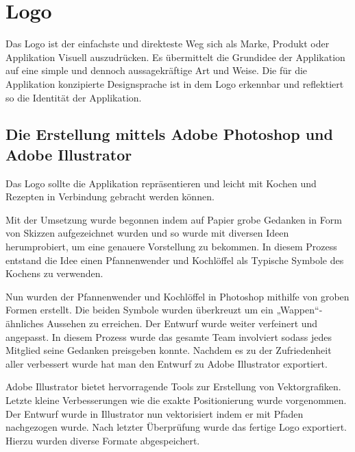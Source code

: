 \section{Logo\cite{Logo}}
Das Logo ist der einfachste und direkteste Weg sich als Marke, Produkt oder Applikation Visuell auszudrücken. Es übermittelt die Grundidee der Applikation auf eine simple und dennoch aussagekräftige Art und Weise. Die für die Applikation konzipierte Designsprache ist in dem Logo erkennbar und reflektiert so die Identität der Applikation.


\subsection{Die Erstellung mittels Adobe Photoshop und Adobe Illustrator}
Das Logo sollte die Applikation repräsentieren und leicht mit Kochen und Rezepten in Verbindung gebracht werden können.

Mit der Umsetzung wurde begonnen indem auf Papier grobe Gedanken in Form von Skizzen aufgezeichnet wurden und so wurde mit diversen Ideen herumprobiert, um eine genauere Vorstellung zu bekommen. In diesem Prozess entstand die Idee einen Pfannenwender und Kochlöffel als Typische Symbole des Kochens zu verwenden.

Nun wurden der Pfannenwender und Kochlöffel in Photoshop mithilfe von groben Formen erstellt. Die beiden Symbole wurden überkreuzt um ein „Wappen“-ähnliches Aussehen zu erreichen. Der Entwurf wurde weiter verfeinert und angepasst. In diesem Prozess wurde das gesamte Team involviert sodass jedes Mitglied seine Gedanken preisgeben konnte. Nachdem es zu der Zufriedenheit aller verbessert wurde hat man den Entwurf zu Adobe Illustrator exportiert.

Adobe Illustrator bietet hervorragende Tools zur Erstellung von Vektorgrafiken. Letzte kleine Verbesserungen wie die exakte Positionierung wurde vorgenommen. Der Entwurf wurde in Illustrator nun vektorisiert indem er mit Pfaden nachgezogen wurde. Nach letzter Überprüfung wurde das fertige Logo exportiert. Hierzu wurden diverse Formate abgespeichert.

